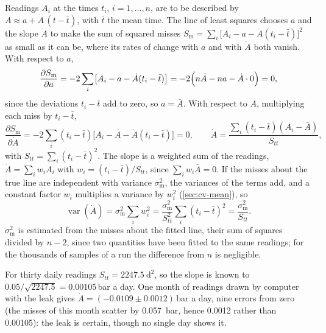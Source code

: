 \begin{toolbox}
Readings $A_i$ at the times $t_i$, $i = 1, \dots, n$, are to be described by
$A \approx a + \dot A\,(t - \bar t)$, with $\bar t$ the mean time. The line
of least squares chooses $a$ and the slope $\dot A$ to make the sum of
squared misses $S_{\mathrm m} = \sum_i\bigl[A_i - a - \dot A(t_i - \bar
t)\bigr]^2$ as small as it can be, where its rates of change with $a$ and
with $\dot A$ both vanish. With respect to $a$,
\begin{equation*}
   \frac{\partial S_{\mathrm m}}{\partial a} = -2\sum_i\bigl[A_i - a - \dot A(t_i -
   \bar t)\bigr] = -2\Bigl(n\bar A - na - \dot A\cdot0\Bigr) = 0 ,
\end{equation*}
since the deviations $t_i - \bar t$ add to zero, so $a = \bar A$. With
respect to $\dot A$, multiplying each miss by $t_i - \bar t$,
\begin{equation*}
   \frac{\partial S_{\mathrm m}}{\partial\dot A} = -2\sum_i(t_i - \bar t)\bigl[A_i -
   \bar A - \dot A(t_i - \bar t)\bigr] = 0 , \qquad
   \dot A = \frac{\sum_i(t_i - \bar t)(A_i - \bar A)}{S_{tt}} ,
\end{equation*}
with $S_{tt} = \sum_i(t_i - \bar t)^2$. The slope is a weighted sum of the
readings, $\dot A = \sum_iw_iA_i$ with $w_i = (t_i - \bar t)/S_{tt}$, since
$\sum_iw_i\bar A = 0$. If the misses about the true line are independent
with variance $\sigma_{\mathrm m}^2$, the variances of the terms add, and a
constant factor $w_i$ multiplies a variance by $w_i^2$
(\cref{sec:cv-mean}), so
\begin{equation*}
   \operatorname{var}(\dot A) = \sigma_{\mathrm m}^2\sum_iw_i^2
   = \frac{\sigma_{\mathrm m}^2}{S_{tt}^2}\sum_i(t_i - \bar t)^2
   = \frac{\sigma_{\mathrm m}^2}{S_{tt}} .
\end{equation*}
$\sigma_{\mathrm m}^2$ is estimated from the misses about the fitted line, their sum
of squares divided by $n - 2$, since two quantities have been fitted to
the same readings; for the thousands of samples of a run the difference
from $n$ is negligible.
\end{toolbox}

For thirty daily readings $S_{tt} = \SI{2247.5}{\day\squared}$, so the
slope is known to $0.05/\sqrt{2247.5} = 0.00105$\,bar a day. One
month of readings drawn by computer with the leak gives $\dot A =
(-0.0109 \pm 0.0012)$\,bar a day, nine errors from zero (the
misses of this month scatter by \SI{0.057}{bar}, hence 0.0012 rather than
0.00105): the leak is certain, though no single day shows it.

